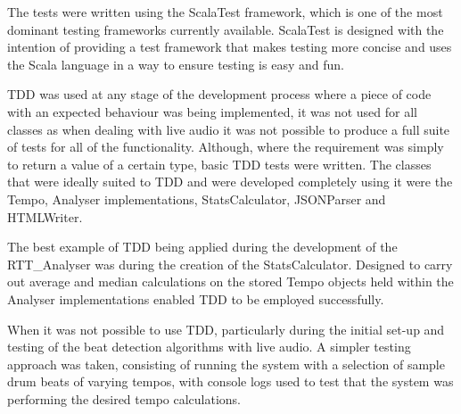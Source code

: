 \documentclass[a4paper, 11pt]{article}
\begin{document}
The tests were written using the ScalaTest framework, which is one of the most dominant testing frameworks currently available. ScalaTest is designed with the intention of providing a test framework that makes testing more concise and uses the Scala language in a way to ensure testing is easy and fun\cite{testingScala}.

TDD was used at any stage of the development process where a piece of code with an expected behaviour was being implemented, it was not used for all classes as when dealing with live audio it was not possible to produce a full suite of tests for all of the functionality. Although, where the requirement was simply to return a value of a certain type, basic TDD tests were written. The classes that were ideally suited to TDD and were developed completely using it were the Tempo, Analyser implementations, StatsCalculator, JSONParser and HTMLWriter. \par

The best example of TDD being applied during the development of the RTT\_Analyser was during the creation of the StatsCalculator. Designed to carry out average and median calculations on the stored Tempo objects held within the Analyser implementations enabled TDD to be employed successfully.

When it was not possible to use TDD, particularly during the initial set-up and testing of the beat detection algorithms with live audio. A simpler testing approach was taken, consisting of running the system with a selection of sample drum beats of varying tempos, with console logs used to test that the system was performing the desired tempo calculations.
\end{document}
